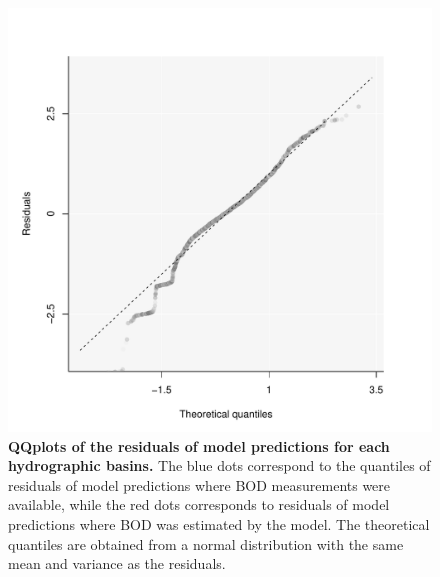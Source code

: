 \documentclass[11pt, oneside]{article}
\begin{document}
\begin{figure}[H]
\begin{center}
\includegraphics[page=1, width=1\linewidth]{scripts/b0_6_4/out_mTL/fig_qqplot_residuals.pdf}
\caption{
    \textbf{QQplots of the residuals of model predictions for each hydrographic basins.}
    The blue dots correspond to the quantiles of residuals of model predictions where BOD measurements were available, while the red dots corresponds to residuals of model predictions where BOD was estimated by the model.
    The theoretical quantiles are obtained from a normal distribution with the same mean and variance as the residuals.
} 
\end{center}
\end{figure}
\end{document}
